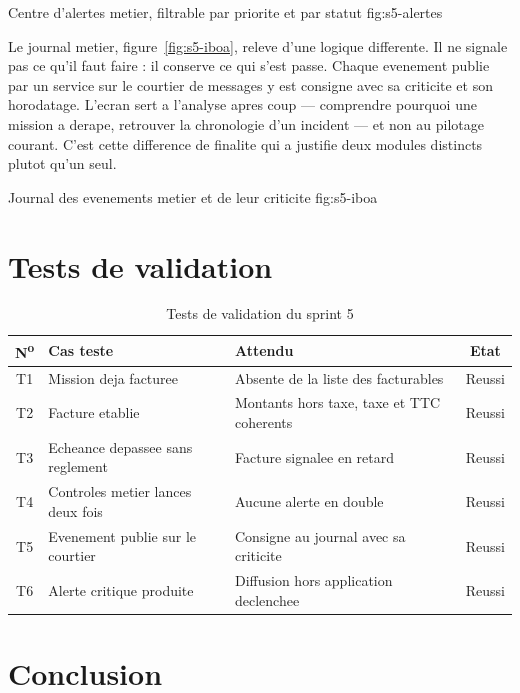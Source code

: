   {Centre d'alertes metier, filtrable par priorite et par statut}
  {fig:s5-alertes}

Le journal metier, figure~\ref{fig:s5-iboa}, releve d'une logique
differente. Il ne signale pas ce qu'il faut faire : il conserve ce qui
s'est passe. Chaque evenement publie par un service sur le courtier de
messages y est consigne avec sa criticite et son horodatage. L'ecran sert
a l'analyse apres coup --- comprendre pourquoi une mission a derape,
retrouver la chronologie d'un incident --- et non au pilotage courant.
C'est cette difference de finalite qui a justifie deux modules distincts
plutot qu'un seul.

  {Journal des evenements metier et de leur criticite}
  {fig:s5-iboa}

\section{Tests de validation}

\begin{table}[H]
\centering
\caption{Tests de validation du sprint 5}
\label{tab:tests-s5}
\small
\begin{tabularx}{\textwidth}{@{}cXp{2.9cm}c@{}}
\toprule
\textbf{N\textsuperscript{o}} & \textbf{Cas teste} & \textbf{Attendu} &
\textbf{Etat} \\ \midrule
T1 & Mission deja facturee & Absente de la liste des facturables & Reussi \\
T2 & Facture etablie & Montants hors taxe, taxe et TTC coherents & Reussi \\
T3 & Echeance depassee sans reglement & Facture signalee en retard & Reussi \\
T4 & Controles metier lances deux fois & Aucune alerte en double & Reussi \\
T5 & Evenement publie sur le courtier & Consigne au journal avec sa criticite & Reussi \\
T6 & Alerte critique produite & Diffusion hors application declenchee & Reussi \\
\bottomrule
\end{tabularx}
\end{table}

\section*{Conclusion}

